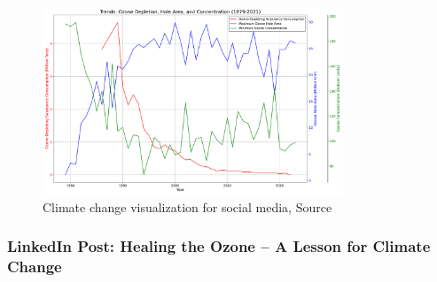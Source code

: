 \documentclass[a4paper,landscape]{article}
\begin{document}
\begin{figure}[H]
    \centering
    \includegraphics[width=0.8\textwidth]{ozone_data_visualization_t4.pdf} %
    \caption{Climate change visualization for social media, Source \cite{nasa2024ozone}}
    \label{fig:climate}
\end{figure}

\subsubsection{LinkedIn Post: Healing the Ozone – A Lesson for Climate Change}
\end{document}
